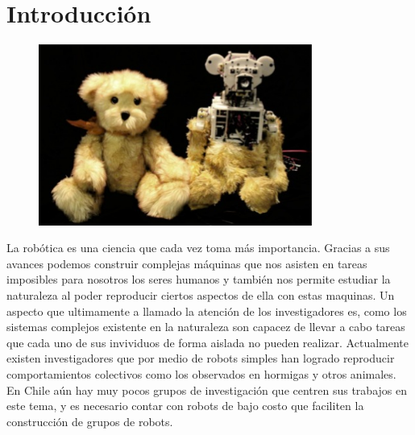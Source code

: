 
\chapter{Introducción} %

\label{Chapter1} %





\begin{figure}[htbp]
	\centering
		\includegraphics[width=0.8\textwidth]{./Figures/robot.jpg}
	\label{fig:Huggable}
\end{figure}

La robótica es una ciencia que cada vez toma más importancia. Gracias a sus avances podemos construir complejas máquinas que nos asisten en tareas imposibles para nosotros los seres humanos y también nos permite estudiar la naturaleza al poder reproducir ciertos aspectos de ella con estas maquinas. Un aspecto que ultimamente a llamado la atención de los investigadores es, como los sistemas complejos existente en la naturaleza son capacez de llevar a cabo tareas que cada uno de sus invividuos de forma aislada no pueden realizar. Actualmente existen investigadores que por medio de robots simples han logrado reproducir comportamientos colectivos como los observados en hormigas y otros animales. En Chile aún hay muy pocos grupos de investigación que centren sus trabajos en este tema, y es necesario contar con robots de bajo costo que faciliten la construcción de grupos de robots.

